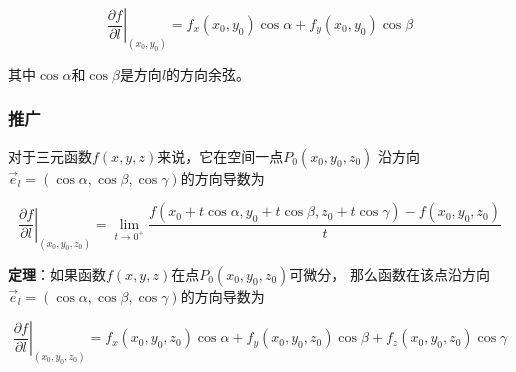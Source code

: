 \documentclass[12pt, a4paper]{article}
\numberwithin{equation}{section}
\begin{document}
    \begin{equation}
        \left.\frac{\partial f}{\partial l}\right|_{\left(x_0, y_0\right)}=f_x\left(x_0, y_0\right) \cos \alpha+f_y\left(x_0, y_0\right) \cos \beta
    \end{equation}

    其中\(\cos \alpha\)和\(\cos \beta\)是方向\(l\)的方向余弦。

\subsubsection{推广}


    对于三元函数\(f\left(x,y,z\right)\)来说，它在空间一点\(P_0\left(x_0,y_0,z_0\right)\)
    沿方向\\\(\overrightarrow{e}_l = \left(\cos \alpha, \cos \beta, \cos \gamma\right)\)的方向导数为

    \begin{equation}
        \left.\frac{\partial f}{\partial l}\right|_{\left(x_0, y_0, z_0\right)}=
        \lim _{t \rightarrow 0^{+}} \frac{f\left(x_0+t \cos \alpha, y_0+t \cos \beta, z_0
        +t \cos \gamma\right)-f\left(x_0, y_0, z_0\right)}{t}
        \end{equation}

    \textbf{定理}：如果函数\(f\left(x,y,z\right)\)在点\(P_0\left(x_0,y_0,z_0\right)\)可微分，
    那么函数在该点沿方向\\\(\overrightarrow{e}_l = \left(\cos \alpha, \cos \beta, \cos \gamma\right)\)的方向导数为

    \begin{equation}
        \left.\frac{\partial f}{\partial l}\right|_{\left(x_0, y_0, z_0\right)}=
        f_x\left(x_0, y_0, z_0\right) \cos \alpha+f_y\left(x_0, y_0, z_0\right) \cos \beta+
        f_z\left(x_0, y_0, z_0\right) \cos \gamma
    \end{equation}
\end{document}
